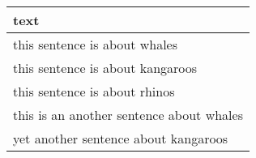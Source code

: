 \begin{tabular}{l}
\toprule
text \\
\midrule
this sentence is about whales \\
this sentence is about kangaroos \\
this sentence is about rhinos \\
this is an another sentence about whales \\
yet another sentence about kangaroos \\
\bottomrule
\end{tabular}

